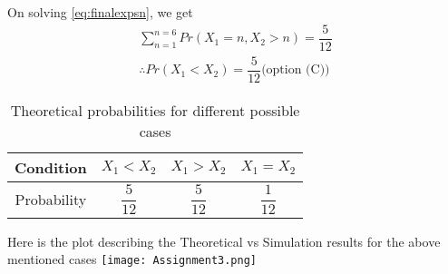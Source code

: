 \documentclass[journal,12pt,twocolumn]{IEEEtran}
\begin{document}
On solving \eqref{eq:finalexpsn}, we get
\begin{align}
    \tag{26.8}
    \sum_{n=1}^{n=6}Pr(X_{1}=n,X_{2}>n)=\dfrac{5}{12} \\
    \tag{26.9}
    \therefore Pr(X_{1}<X_{2})=\dfrac{5}{12}\text{(option (C))}
\end{align}
\noindent
\begin{table}[h!]
\centering
\caption{Theoretical probabilities for different possible cases}
\label{table:1}
\begin{tabular}{|c||c|c|c|}
    \hline
    Condition & $X_{1}<X_{2}$& $X_{1}>X_{2}$& $X_{1}=X_{2}$ \\
    \hline
    Probability & $\dfrac{5}{12}$ & $\dfrac{5}{12}$ & $\dfrac{1}{12}$\\[1ex]
    \hline
\end{tabular}
\end{table}
\newline
Here is the plot describing the Theoretical vs Simulation results for the above mentioned cases
\newline
\newline
\centering
\texttt{[image: Assignment3.png]}
\end{document}
